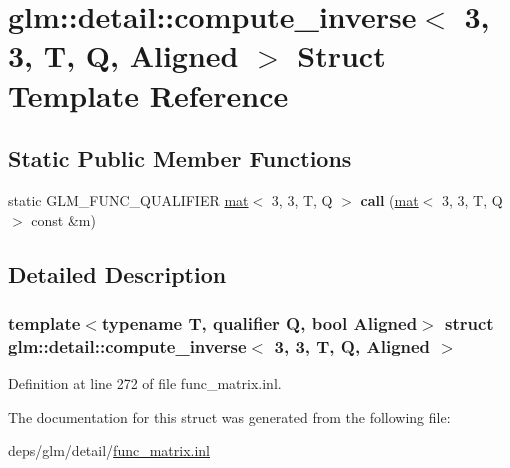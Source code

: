 \hypertarget{structglm_1_1detail_1_1compute__inverse_3_013_00_013_00_01T_00_01Q_00_01Aligned_01_4}{}\section{glm\+:\+:detail\+:\+:compute\+\_\+inverse$<$ 3, 3, T, Q, Aligned $>$ Struct Template Reference}
\label{structglm_1_1detail_1_1compute__inverse_3_013_00_013_00_01T_00_01Q_00_01Aligned_01_4}
\subsection*{Static Public Member Functions}
\begin{DoxyCompactItemize}
\item 
\mbox{\label{structglm_1_1detail_1_1compute__inverse_3_013_00_013_00_01T_00_01Q_00_01Aligned_01_4_a55c36db03fba738434c3f47b6a794ae7}} 
static G\+L\+M\+\_\+\+F\+U\+N\+C\+\_\+\+Q\+U\+A\+L\+I\+F\+I\+ER \hyperlink{structglm_1_1mat}{mat}$<$ 3, 3, T, Q $>$ {\bfseries call} (\hyperlink{structglm_1_1mat}{mat}$<$ 3, 3, T, Q $>$ const \&m)
\end{DoxyCompactItemize}


\subsection{Detailed Description}
\subsubsection*{template$<$typename T, qualifier Q, bool Aligned$>$\newline
struct glm\+::detail\+::compute\+\_\+inverse$<$ 3, 3, T, Q, Aligned $>$}



Definition at line 272 of file func\+\_\+matrix.\+inl.



The documentation for this struct was generated from the following file\+:\begin{DoxyCompactItemize}
\item 
deps/glm/detail/\hyperlink{func__matrix_8inl}{func\+\_\+matrix.\+inl}\end{DoxyCompactItemize}
